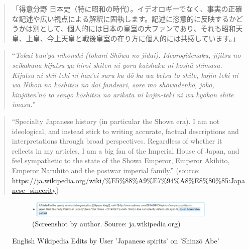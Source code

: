 \documentclass[10pt,british,A4paper,,openany]{memoir}
\begin{document}
\begin{quote}
「得意分野\newline
日本史（特に昭和の時代）。イデオロギーでなく、事実の正確な記述や広い視点による解釈に固執します。記述に恣意的に反映するかどうかは別として、個人的には日本の皇室の大ファンであり、それも昭和天皇、上皇、今上天皇と戦後皇室の在り方に個人的には共感しています。」
\end{quote}

\begin{quote}
``\emph{Tokui bun'ya\newline
nihonshi (tokuni Shōwa no jidai). Ideorogīdenaku, jijitsu no seikakuna
kijutsu ya hiroi shiten ni yoru kaishaku ni koshū shimasu. Kijutsu ni
shii-teki ni han'ei suru ka dō ka wa betsu to shite, kojin-teki ni wa
Nihon no kōshitsu no dai fandeari, sore mo shōwadenkō, jōkō, kinjōten'nō
to sengo kōshitsu no arikata ni kojin-teki ni wa kyōkan shite imasu.}''
\end{quote}

\begin{quote}
``Specialty\newline
Japanese history (in particular the Showa era). I am not ideological,
and instead stick to writing accurate, factual descriptions and
interpretations through broad perspectives. Regardless of whether it
reflects in my articles, I am a big fan of the Imperial House of Japan,
and feel sympathetic to the state of the Showa Emperor, Emperor Akihito,
Emperor Naruhito and the postwar imperial family.'' (source:
\url{https://ja.wikipedia.org/wiki/\%E5\%88\%A9\%E7\%94\%A8\%E8\%80\%85:Japanese_sincerity})
\end{quote}

\begin{figure}[!htb]
 \centering
 \begin{subfigure}[b]{1\textwidth}
  \includegraphics[width=.9\textwidth]{images/wiki/japanese-spirits-abe.jpg}
  \caption*{(Screenshot by author. Source: ja.wikipedia.org)}
  \label{fig:nicotop}
 \end{subfigure}
 \caption{English Wikipedia Edits by User 'Japanese spirits' on 'Shinzō Abe'}\label{fig:js-abe}
\end{figure}
\end{document}

